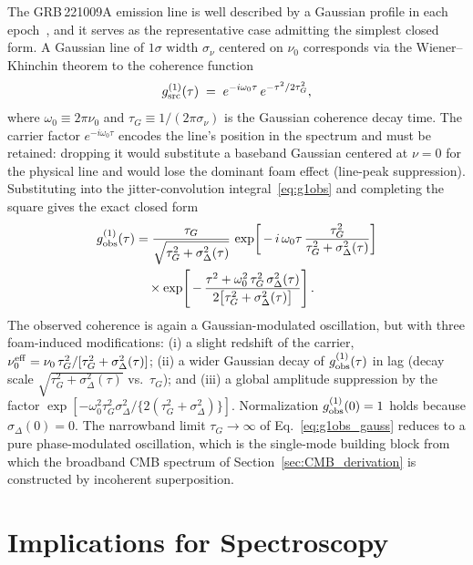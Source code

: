 \documentclass[aps,prd,onecolumn,amsmath,amssymb]{revtex4-2}
\begin{document}
The GRB\,221009A emission line is well described by a Gaussian profile
in each epoch~\cite{YQZhang2024}, and it serves as the representative
case admitting the simplest closed form.
A Gaussian line of $1\sigma$ width $\sigma_\nu$ centered on $\nu_0$
corresponds via the Wiener--Khinchin theorem to the coherence function
\begin{equation}
  g^{(1)}_{\rm src}(\tau) \;=\; e^{-i\omega_0\tau}\,e^{-\tau^2/2\tau_G^2},
  \label{eq:g1src_gauss}
\end{equation}
where $\omega_0 \equiv 2\pi\nu_0$ and $\tau_G \equiv 1/(2\pi\sigma_\nu)$ is the
Gaussian coherence decay time.  The carrier factor $e^{-i\omega_0\tau}$
encodes the line's position in the spectrum and must be retained: dropping
it would substitute a baseband Gaussian centered at $\nu=0$ for the physical
line and would lose the dominant foam effect (line-peak suppression).
Substituting into the jitter-convolution integral~\eqref{eq:g1obs} and
completing the square gives the exact closed form
\begin{align}
  g^{(1)}_{\rm obs}(\tau)
  &= \frac{\tau_G}{\sqrt{\tau_G^2+\sigma_\Delta^2(\tau)}}\,
     \exp\!\left[\,-\,i\,\omega_0\tau\,
       \frac{\tau_G^2}{\tau_G^2+\sigma_\Delta^2(\tau)}\right] \notag\\
  &\quad\times \exp\!\left[\,-\,\frac{\tau^2+\omega_0^2\,
       \tau_G^2\,\sigma_\Delta^2(\tau)}
       {2\bigl[\tau_G^2+\sigma_\Delta^2(\tau)\bigr]}\right].
  \label{eq:g1obs_gauss}
\end{align}
The observed coherence is again a Gaussian-modulated oscillation, but
with three foam-induced modifications: (i) a slight redshift of the
carrier, $\nu_0^{\rm eff} = \nu_0\,\tau_G^2/[\tau_G^2+\sigma_\Delta^2(\tau)]$;
(ii) a wider Gaussian decay of $g^{(1)}_{\rm obs}(\tau)$ in lag (decay
scale $\sqrt{\tau_G^2+\sigma_\Delta^2(\tau)}$ vs.\ $\tau_G$);
and (iii) a global amplitude suppression by the factor
$\exp\!\left[-\omega_0^2\tau_G^2\sigma_\Delta^2/\{2(\tau_G^2+\sigma_\Delta^2)\}\right]$.
Normalization $g^{(1)}_{\rm obs}(0)=1$ holds because $\sigma_\Delta(0)=0$.
The narrowband limit $\tau_G\to\infty$ of
Eq.~\eqref{eq:g1obs_gauss} reduces to a pure phase-modulated
oscillation, which is the single-mode building block from which the
broadband CMB spectrum of Section~\ref{sec:CMB_derivation} is
constructed by incoherent superposition.

\section{Implications for Spectroscopy}
\label{sec:spec}
\end{document}
